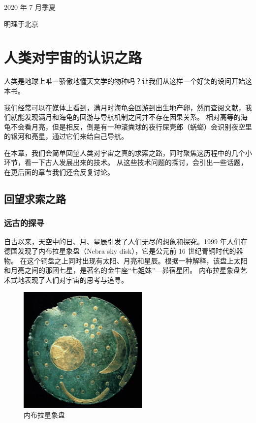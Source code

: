 \documentclass[a4paper,10.5pt]{book}
\begin{document}
\hfill \hfill 2020 年 7 月季夏

\hfill \hfill 明理于北京

\newpage

\setlength{\parindent}{0em}
\setlength{\parskip}{0em}

\renewcommand\contentsname{目录}
\tableofcontents
\thispagestyle{empty}

\newpage

\setcounter{page}{1} %

\setlength{\parindent}{0em}
\setlength{\parskip}{1.2em}

\chapter{人类对宇宙的认识之路}

人类是地球上唯一骄傲地懂天文学的物种吗？让我们从这样一个好笑的设问开始这本书。

我们经常可以在媒体上看到，满月时海龟会回游到出生地产卵，然而查阅文献，我们就能发现满月和海龟的回游与导航机制之间并不存在因果关系。
相对高等的海龟不会看月亮，但是相反，倒是有一种滚粪球的夜行屎壳郎（蜣螂）会识别夜空里的银河和亮星，通过它们来给自己导航。

在本章，我们会简单回望人类对宇宙之真的求索之路，同时聚焦这历程中的几个小环节，看一下古人发展出来的技术。
从这些技术问题的探讨，会引出一些话题，在更后面的章节我们还会反复讨论。

\section{回望求索之路}

\subsection{远古的探寻}

自古以来，天空中的日、月、星辰引发了人们无尽的想象和探究。1999 年人们在德国发现了内布拉星象盘（Nebra sky disk），它是公元前 16 世纪青铜时代的器物。
在这个铜盘之上同时出现有太阳、月亮和星辰。根据一种解释，该盘上太阳和月亮之间的那团七星，是著名的金牛座“七姐妹”—昴宿星团。
内布拉星象盘艺术式地表现了人们对宇宙的思考与追寻。\cite{pasztor2007interpretation}

\begin{figure}[ht]
\centering
\includegraphics[width=2.5in]{images/1_01-Nebra_sky_disk.jpg}
\caption{内布拉星象盘}
\end{figure}
\end{document}
